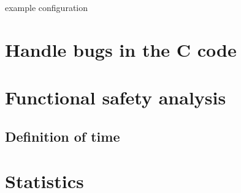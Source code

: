 \begin{table}[!h]
\label{TABLE:STATUSES_EXAMPLE}

\caption{example configuration}
\end{table}

\section{Handle bugs in the C code}
\label{sec:handlebugs}

\section{Functional safety analysis}
\subsection{Definition of time}
\label{SEC:FUNCTIONAL_SAFETY_TIME}

\section{Statistics}
